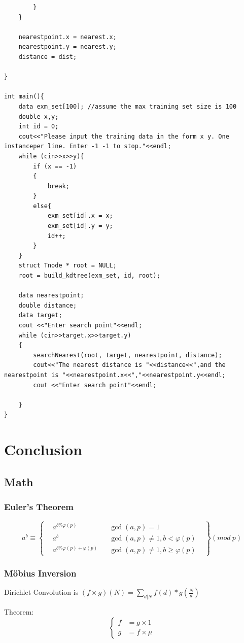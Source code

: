 \documentclass[10pt]{ctexart}
\begin{document}
{{\begin{lstlisting}
        }    
    }    
        
    nearestpoint.x = nearest.x;    
    nearestpoint.y = nearest.y;    
    distance = dist;    
        
}    
    
int main(){    
    data exm_set[100]; //assume the max training set size is 100    
    double x,y;    
    int id = 0;    
    cout<<"Please input the training data in the form x y. One instanceper line. Enter -1 -1 to stop."<<endl;    
    while (cin>>x>>y){    
        if (x == -1)    
        {    
            break;    
        }    
        else{    
            exm_set[id].x = x;    
            exm_set[id].y = y;    
            id++;    
        }    
    }    
    struct Tnode * root = NULL;    
    root = build_kdtree(exm_set, id, root);    
        
    data nearestpoint;    
    double distance;    
    data target;    
    cout <<"Enter search point"<<endl;    
    while (cin>>target.x>>target.y)    
    {    
        searchNearest(root, target, nearestpoint, distance);    
        cout<<"The nearest distance is "<<distance<<",and the nearestpoint is "<<nearestpoint.x<<","<<nearestpoint.y<<endl;    
        cout <<"Enter search point"<<endl;    
    
    }    
}
\end{lstlisting}

\newpage
\section{Conclusion}
\subsection{Math}
\subsubsection{Euler's Theorem}
\begin{equation*}
    a^b\equiv\left\{
    \begin{aligned}
    &a^{b\%\varphi(p)} & & \gcd(a,p)=1&\\
    &a^b & &\gcd(a,p)\not=1,b<\varphi(p) \\
    &a^{b\%\varphi(p) + \varphi(p)} & & \gcd(a,p)\not=1,b\geq \varphi(p) &
    \end{aligned}
    \right\}
    (mod\ p)
\end{equation*}
\subsubsection{Möbius Inversion}
{
Dirichlet Convolution is $(f\times g)(N)=\sum_{d|N} f(d) * g(\frac{N}{d})$
\par
Theorem:
\begin{equation*}
    \left\{
        \begin{aligned} 
            f &= g \times 1 \\
            g &= f \times \mu
        \end{aligned} 
    \right. 
\end{equation*}
}

}}
\end{document}
